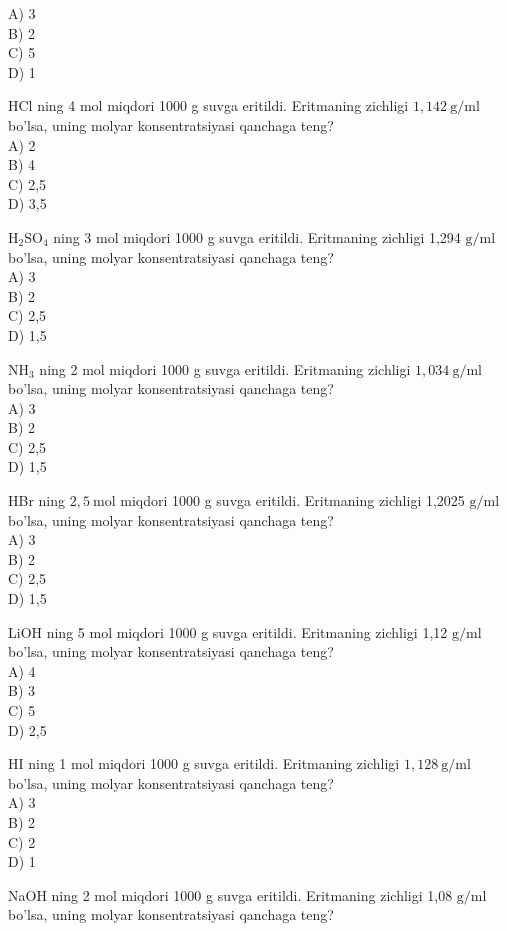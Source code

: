 A) 3\\
B) 2\\
C) 5\\
D) 1
  \item HCl ning 4 mol miqdori 1000 g suvga eritildi. Eritmaning zichligi $1,142 \mathrm{~g} / \mathrm{ml}$ bo'lsa, uning molyar konsentratsiyasi qanchaga teng?\\
A) 2\\
B) 4\\
C) 2,5\\
D) 3,5
  \item $\mathrm{H}_{2} \mathrm{SO}_{4}$ ning 3 mol miqdori 1000 g suvga eritildi. Eritmaning zichligi 1,294 $\mathrm{g} / \mathrm{ml}$ bo'lsa, uning molyar konsentratsiyasi qanchaga teng?\\
A) 3\\
B) 2\\
C) 2,5\\
D) 1,5
  \item $\mathrm{NH}_{3}$ ning 2 mol miqdori 1000 g suvga eritildi. Eritmaning zichligi $1,034 \mathrm{~g} / \mathrm{ml}$ bo'lsa, uning molyar konsentratsiyasi qanchaga teng?\\
A) 3\\
B) 2\\
C) 2,5\\
D) 1,5
  \item HBr ning $2,5 \mathrm{~mol}$ miqdori 1000 g suvga eritildi. Eritmaning zichligi 1,2025 $\mathrm{g} / \mathrm{ml}$ bo'lsa, uning molyar konsentratsiyasi qanchaga teng?\\
A) 3\\
B) 2\\
C) 2,5\\
D) 1,5
  \item LiOH ning 5 mol miqdori 1000 g suvga eritildi. Eritmaning zichligi 1,12 $\mathrm{g} / \mathrm{ml}$ bo'lsa, uning molyar konsentratsiyasi qanchaga teng?\\
A) 4\\
B) 3\\
C) 5\\
D) 2,5
  \item HI ning 1 mol miqdori 1000 g suvga eritildi. Eritmaning zichligi $1,128 \mathrm{~g} / \mathrm{ml}$ bo'lsa, uning molyar konsentratsiyasi qanchaga teng?\\
A) 3\\
B) 2\\
C) 2\\
D) 1
  \item NaOH ning 2 mol miqdori 1000 g suvga eritildi. Eritmaning zichligi 1,08 $\mathrm{g} / \mathrm{ml}$ bo'lsa, uning molyar konsentratsiyasi qanchaga teng?\\
